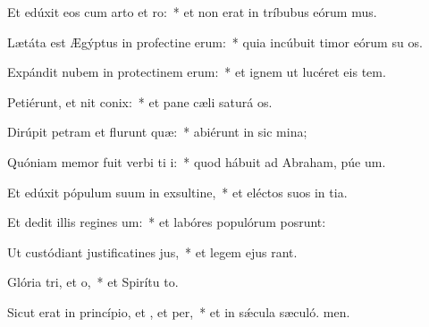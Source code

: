 \item Et edúxit eos cum arto et ro:~* et non erat in tríbubus eórum mus.
\item Lætáta est Ægýptus in profectine erum:~* quia incúbuit timor eórum su os.
\item Expándit nubem in protectinem erum:~* et ignem ut lucéret eis  tem.
\item Petiérunt, et nit conix:~* et pane cæli saturá os.
\item Dirúpit petram et flurunt quæ:~* abiérunt in sic mina;
\item Quóniam memor fuit verbi ti i:~* quod hábuit ad Abraham, púe um.
\item Et edúxit pópulum suum in exsultine,~* et eléctos suos in tia.
\item Et dedit illis regines um:~* et labóres populórum posrunt:
\item Ut custódiant justificatines jus,~* et legem ejus rant.
\item Glória tri, et o,~* et Spirítu to.
\item Sicut erat in princípio, et , et per,~* et in sǽcula sæculó. men.
